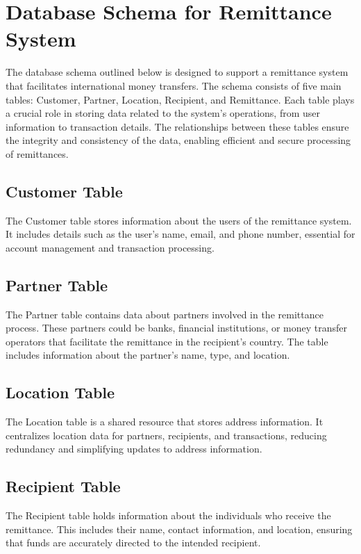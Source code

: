 \documentclass[10pt,a4paper]{article}
\begin{document}
\section*{Database Schema for Remittance System}

The database schema outlined below is designed to support a remittance system that facilitates international money transfers. The schema consists of five main tables: Customer, Partner, Location, Recipient, and Remittance. Each table plays a crucial role in storing data related to the system's operations, from user information to transaction details. The relationships between these tables ensure the integrity and consistency of the data, enabling efficient and secure processing of remittances.

\subsection*{Customer Table}
The Customer table stores information about the users of the remittance system. It includes details such as the user's name, email, and phone number, essential for account management and transaction processing.

\subsection*{Partner Table}
The Partner table contains data about partners involved in the remittance process. These partners could be banks, financial institutions, or money transfer operators that facilitate the remittance in the recipient's country. The table includes information about the partner's name, type, and location.

\subsection*{Location Table}
The Location table is a shared resource that stores address information. It centralizes location data for partners, recipients, and transactions, reducing redundancy and simplifying updates to address information.

\subsection*{Recipient Table}
The Recipient table holds information about the individuals who receive the remittance. This includes their name, contact information, and location, ensuring that funds are accurately directed to the intended recipient.
\end{document}
